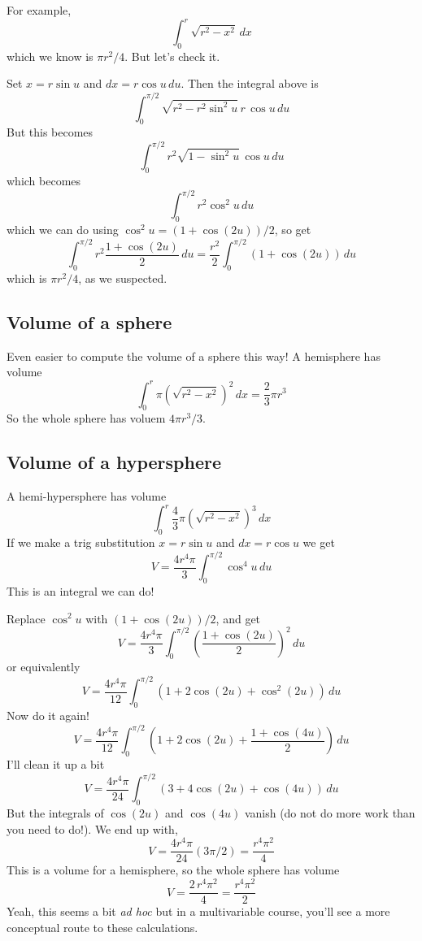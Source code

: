 \documentclass[12pt]{article}
\begin{document}
For example,
$$
\int_0^r \sqrt{r^2 - x^2} \, dx
$$
which we know is $\pi r^2/4$.  But let's check it.

Set $x = r \sin u$ and $dx = r \cos u \, du$.  Then the integral above is
$$
\int_0^{\pi/2} \sqrt{r^2 - r^2 \sin^2 u} \, r\, \cos u \, du
$$
But this becomes
$$
\int_0^{\pi/2} r^2 \sqrt{1 - \sin^2 u} \, \cos u \, du
$$
which becomes
$$
\int_0^{\pi/2} r^2 \cos^2 u \, du
$$
which we can do using $\cos^2 u = (1 + \cos (2u))/2$, so get
$$
\int_0^{\pi/2} r^2 \frac{1 + \cos (2u)}{2} \, du = \frac{r^2}{2} \int_0^{\pi/2} (1 + \cos (2u)) \, du 
$$
which is $\pi r^2/4$, as we suspected.

\subsection*{Volume of a sphere}

Even easier to compute the volume of a sphere this way!  A hemisphere has volume
$$
\int_0^r \pi (\sqrt{r^2 - x^2})^2 \, dx = \frac{2}{3} \pi r^3
$$
So the whole sphere has voluem $4 \pi r^3/3$.

\subsection*{Volume of a hypersphere}

A hemi-hypersphere has volume
$$
\int_0^r \frac{4}{3} \pi (\sqrt{r^2 - x^2})^3 \, dx
$$
If we make a trig substitution $x = r \sin u$ and $dx = r \cos u$ we get
$$
V = \frac{4 r^4 \pi}{3} \int_0^{\pi/2} \cos^4 u \, du
$$
This is an integral we can do!

Replace $\cos^2 u$ with $(1 + \cos(2u))/2$, and get
$$
V = \frac{4 r^4 \pi}{3} \int_0^{\pi/2} \left( \frac{1 + \cos (2u)}{2} \right)^2 \, du
$$
or equivalently
$$
V = \frac{4 r^4 \pi}{12} \int_0^{\pi/2} \left( 1 + 2 \cos (2u) + \cos^2 (2u) \right) \, du
$$
Now do it again!
$$
V = \frac{4 r^4 \pi}{12} \int_0^{\pi/2} \left( 1 + 2 \cos (2u) + \frac{1 + \cos (4u)}{2} \right) \, du
$$
I'll clean it up a bit
$$
V = \frac{4 r^4 \pi}{24} \int_0^{\pi/2} \left( 3 + 4 \cos (2u) + \cos (4u) \right) \, du
$$
But the integrals of $\cos (2u)$ and $\cos (4u)$ vanish (do not do more work than you need to do!).
We end up with,
$$
V = \frac{4 r^4 \pi}{24} (3 \pi/2) = \frac{r^4 \pi^2}{4}
$$
This is a volume for a hemisphere, so the whole sphere has volume
$$
V = \frac{2 \, r^4 \pi^2}{4} = \frac{r^4 \pi^2}{2}
$$
Yeah, this seems a bit \textit{ad hoc} but in a multivariable course,
you'll see a more conceptual route to these calculations.
\end{document}
